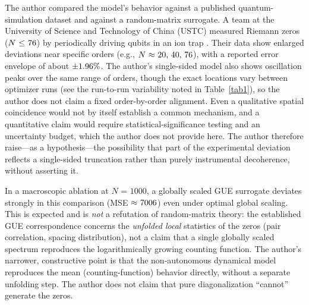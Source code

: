 \documentclass[mca,article,submit,oneauthor,pdftex]{Definitions/mdpi}
\begin{document}
The author compared the model's behavior against a published quantum-simulation
dataset and against a random-matrix surrogate. A team at the University
of Science and Technology of China (USTC) measured Riemann zeros
(\({N}~\text{\ensuremath{\le}~76}\)) by periodically driving qubits in an ion trap
\cite{he2020,he2021}.
Their data show enlarged deviations near specific orders (e.g.,
\({N}~\text{\ensuremath{\approx}~20, 40, 76}\)), with a reported error envelope of about
\(\text{\ensuremath{\pm}1.96\%}\). The author's single-sided model also shows oscillation
peaks over the same range of orders, though the exact locations vary
between optimizer runs (see the run-to-run variability noted in
Table~\ref{tab1}), so the author does not claim a fixed order-by-order
alignment. Even a qualitative spatial coincidence would not by itself
establish a common mechanism, and a quantitative claim would require
statistical-significance testing and an uncertainty budget, which the author does
not provide here. The author therefore raise---as a hypothesis---the
possibility that part of the experimental deviation reflects a
single-sided truncation rather than purely instrumental decoherence,
without asserting it.

In a macroscopic ablation at \({N}\text{ = 1000}\), a globally scaled
GUE surrogate deviates strongly in this comparison (MSE
\(\text{\ensuremath{\approx}~7006}\)) even under optimal global scaling. This is expected
and is \emph{not} a refutation of random-matrix theory: the established
GUE correspondence concerns the \emph{unfolded local} statistics of the
zeros (pair correlation, spacing distribution), not a claim that a single
globally scaled spectrum reproduces the logarithmically growing counting
function. The author's narrower, constructive point is that the non-autonomous
dynamical model reproduces the mean (counting-function) behavior
directly, without a separate unfolding step. The author does not claim that pure
diagonalization ``cannot'' generate the zeros.
\end{document}
